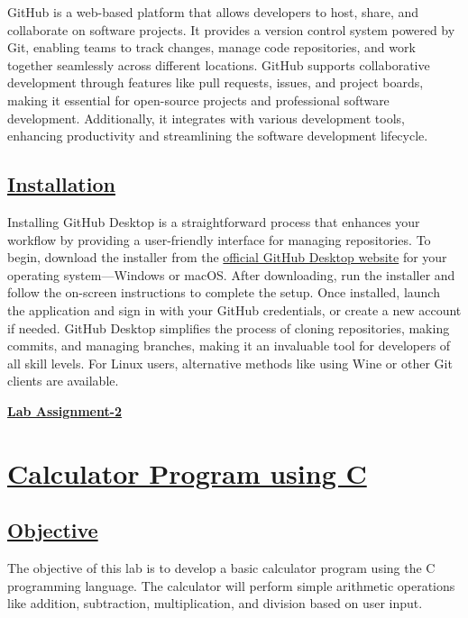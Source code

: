 \documentclass{article}
\begin{document}
\large{GitHub is a web-based platform that allows developers to host, share, and collaborate on software projects. It provides a version control system powered by Git, enabling teams to track changes, manage code repositories, and work together seamlessly across different locations. GitHub supports collaborative development through features like pull requests, issues, and project boards, making it essential for open-source projects and professional software development. Additionally, it integrates with various development tools, enhancing productivity and streamlining the software development lifecycle.}
\vspace{1 cm}
\begin{center}
    \section*{\textbf{\underline{Installation}}}
\end{center}

\large{Installing GitHub Desktop is a straightforward process that enhances your workflow by providing a user-friendly interface for managing repositories. To begin, download the installer from the \href{https://desktop.github.com/}{official GitHub Desktop website} for your operating system—Windows or macOS. After downloading, run the installer and follow the on-screen instructions to complete the setup. Once installed, launch the application and sign in with your GitHub credentials, or create a new account if needed. GitHub Desktop simplifies the process of cloning repositories, making commits, and managing branches, making it an invaluable tool for developers of all skill levels. For Linux users, alternative methods like using Wine or other Git clients are available.}

\newpage
{}

\begin{center}
    \Large{\textbf{\underline{Lab Assignment-2}}}
\end{center}
\section{\underline{Calculator Program using C}}
\subsection{\underline{Objective}}
\LARGE{The objective of this lab is to develop a basic calculator program using the C programming language. The calculator will perform simple arithmetic operations like addition, subtraction, multiplication, and division based on user input.}
\end{document}
